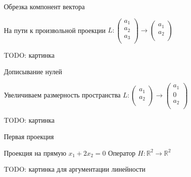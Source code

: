 \documentclass[14pt,xcolor=dvipsnames]{beamer}
\newcommand\R{\mathbb{R}}
\begin{document}
\begin{frame}{Обрезка компонент вектора}

\begin{block}{На пути к произвольной проекции}
  $L : \begin{pmatrix}
    a_1 \\
    a_2 \\
    a_3 \\
  \end{pmatrix} \to 
  \begin{pmatrix}
    a_1 \\
    a_2 \\
  \end{pmatrix}$
\end{block}

\begin{block}{TODO: картинка}

\end{block}
    
\end{frame}


\begin{frame}{Дописывание нулей}

\begin{block}{Увеличиваем размерность пространства}
  $L : \begin{pmatrix}
    a_1 \\
    a_2 \\
  \end{pmatrix} \to 
  \begin{pmatrix}
    a_1 \\
    0  \\
    a_2 \\
  \end{pmatrix}$
\end{block}

\begin{block}{TODO: картинка}

\end{block}
    
\end{frame}
  



\begin{frame}{Первая проекция}

\begin{block}{Проекция на прямую $x_1 + 2x_2 = 0$}
Оператор $H: \R^2 \to \R^2$ 

TODO: картинка для аргументации линейности
\end{block}

\end{frame}
  
\end{document}
